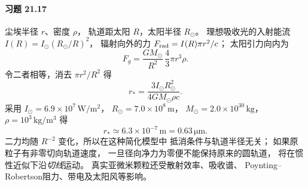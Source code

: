 \paragraph{习题 21.17}
尘埃半径 \(r\)、密度 \(\rho\)，
轨道距太阳 \(R\)，太阳半径 \(R_\odot\)。
理想吸收光的入射能流
\(I(R)=I_\odot(R_\odot/R)^2\)，
辐射向外的力
\(F_{\rm rad}=I(R)\pi r^2/c\)；
太阳引力向内为
\[
F_g=\frac{GM_\odot}{R^2}\,\frac43\pi r^3\rho.
\]
令二者相等，消去 \(\pi r^2/R^2\) 得
\[
\boxed{r_*=
\frac{3I_\odot R_\odot^2}
{4GM_\odot\rho c}}.
\]
采用 \(I_\odot=6.9\times10^7\,\mathrm{W/m^2}\)，
\(R_\odot=7.0\times10^8\,\mathrm m\)，
\(M_\odot=2.0\times10^{30}\,\mathrm{kg}\)，
\(\rho=10^3\,\mathrm{kg/m^3}\) 得
\[
\boxed{r_*\simeq6.3\times10^{-7}\,\mathrm m=0.63\,\mathrm{\mu m}}.
\]
二力均随 \(R^{-2}\) 变化，所以在这种简化模型中
抵消条件与轨道半径无关；
如果原粒子有非零切向轨道速度，
一旦径向净力为零便不能保持原来的圆轨道，
将在惯性近似下沿\emph{切线}运动。
真实亚微米颗粒还受散射效率、吸收谱、
Poynting--Robertson阻力、带电及太阳风等影响。
